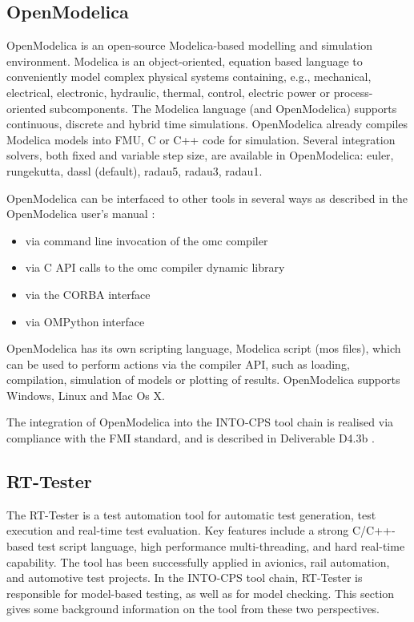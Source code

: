 \subsection{OpenModelica}\label{app:OM}
OpenModelica \cite{Fritzson04} is an open-source Modelica-based modelling and simulation environment.
%
Modelica \cite{Fritzson&98} is an object-oriented, equation based language to conveniently model complex physical systems containing, e.g., mechanical, electrical, electronic, hydraulic, thermal, control, electric power or process-oriented subcomponents. The Modelica language (and OpenModelica) supports continuous, discrete and hybrid time simulations.
%
OpenModelica already compiles Modelica models into  FMU, C or C++ code for simulation.
%
Several integration solvers, both fixed and variable step size, are available in OpenModelica: euler, rungekutta, dassl (default), radau5, radau3, radau1.

OpenModelica can be interfaced to other tools in several ways as described in the OpenModelica user's manual \cite{OpenModelicaUG15}:
%
%
%
\begin{itemize}
%
\item via command line invocation of the omc compiler
%
\item via C API calls to the omc compiler dynamic library
%
\item via the CORBA interface
%
\item via OMPython interface \cite{Ganeson&12}
%
\end{itemize}
%
%
%
OpenModelica has its own scripting language, Modelica script (mos files), which can be used to perform actions via the compiler API, such as loading, compilation, simulation of models or plotting of results.
%
OpenModelica supports Windows, Linux and Mac Os X.

The integration of OpenModelica into the INTO-CPS tool chain is realised via compliance with the FMI standard, and is described in Deliverable D4.3b \cite{INTOCPSD4.3b}.
%
%
%
\subsection{RT-Tester}\label{app:RTT}
The RT-Tester \cite{VSI-rtt-man} is a test automation tool for automatic
test generation, test 
execution and real-time test evaluation. Key features include a strong
C/C++-based test script language, high performance multi-threading, and
hard real-time capability.
The tool has been successfully applied in avionics, rail automation, and
automotive test projects.
%
In the INTO-CPS tool chain, RT-Tester is responsible for model-based testing, as well as for model checking.
%
This section gives some background information on the tool from these two perspectives.
%
%
%
